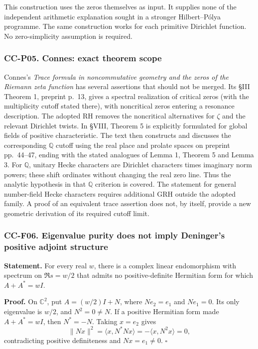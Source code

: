 This construction uses the zeros themselves as input. It supplies none
of the independent arithmetic explanation sought in a stronger
Hilbert--Pólya programme. The same construction works for each primitive
Dirichlet function. No zero-simplicity assumption is required.

\subsubsection{CC-P05. Connes: exact theorem
scope}\label{cc-p05.-connes-exact-theorem-scope}

Connes's \emph{Trace formula in noncommutative geometry and the zeros of
the Riemann zeta function} has several assertions that should not be
merged. Its §III Theorem 1, preprint p.~13, gives a spectral realization
of critical zeros (with the multiplicity cutoff stated there), with
noncritical zeros entering a resonance description. The adopted RH
removes the noncritical alternatives for \(\zeta\) and the relevant
Dirichlet twists. In §VIII, Theorem 5 is explicitly formulated for
global fields of positive characteristic. The text then constructs and
discusses the corresponding \(\mathbb Q\) cutoff using the real place
and prolate spaces on preprint pp.~44--47, ending with the stated
analogues of Lemma 1, Theorem 5 and Lemma 3. For \(\mathbb Q\), unitary
Hecke characters are Dirichlet characters times imaginary norm powers;
these shift ordinates without changing the real zero line. Thus the
analytic hypothesis in that \(\mathbb Q\) criterion is covered. The
statement for general number-field Hecke characters requires additional
GRH outside the adopted family. A proof of an equivalent trace assertion
does not, by itself, provide a new geometric derivation of its required
cutoff limit.

\subsubsection{CC-F06. Eigenvalue purity does not imply Deninger's
positive adjoint
structure}\label{cc-f06.-eigenvalue-purity-does-not-imply-deningers-positive-adjoint-structure}

\textbf{Statement.} For every real \(w\), there is a complex linear
endomorphism with spectrum on \(\Re s=w/2\) that admits no
positive-definite Hermitian form for which \(A+A^*=wI\).

\textbf{Proof.} On \(\mathbb C^2\), put \(A=(w/2)I+N\), where
\(Ne_2=e_1\) and \(Ne_1=0\). Its only eigenvalue is \(w/2\), and
\(N^2=0\ne N\). If a positive Hermitian form made \(A+A^*=wI\), then
\(N^*=-N\). Taking \(x=e_2\) gives \[
 \|Nx\|^2=\langle x,N^*Nx\rangle
          =-\langle x,N^2x\rangle=0,
\] contradicting positive definiteness and \(Nx=e_1\ne0\). \(\square\)

